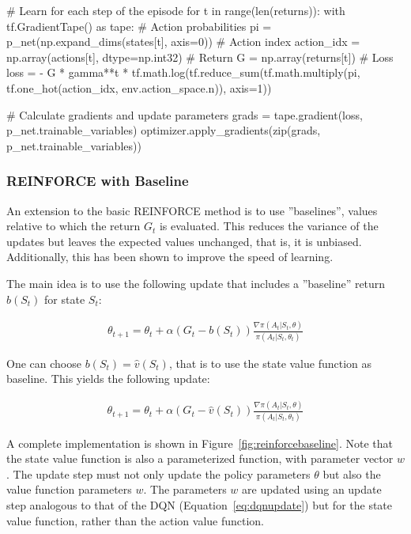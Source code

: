 \begin{pythoncode}
    # Learn for each step of the episode
    for t in range(len(returns)):
        with tf.GradientTape() as tape:
            # Action probabilities
            pi = p_net(np.expand_dims(states[t], axis=0))
            # Action index
            action_idx = np.array(actions[t], dtype=np.int32)
            # Return
            G = np.array(returns[t])
            # Loss
            loss = - G * gamma**t * 
                tf.math.log(tf.reduce_sum(tf.math.multiply(pi, 
                    tf.one_hot(action_idx, env.action_space.n)), axis=1))

        # Calculate gradients and update parameters
        grads = tape.gradient(loss, p_net.trainable_variables)
        optimizer.apply_gradients(zip(grads, p_net.trainable_variables))
\end{pythoncode}


\subsubsection*{REINFORCE with Baseline}

An extension to the basic REINFORCE method is to use ''baselines'', values relative to which the return $G_t$ is evaluated. This reduces the variance of the updates but leaves the expected values unchanged, that is, it is unbiased. Additionally, this has been shown to improve the speed of learning. 

The main idea is to use the following update that includes a ''baseline'' return $b(S_t)$ for state $S_t$:

\begin{align*}
\theta_{t+1} = \theta_t + \alpha(G_t - b(S_t)) \frac{\nabla \pi(A_t | S_t, \theta)}{\pi(A_t | S_t, \theta_t)}
\end{align*}

One can choose $b(S_t) = \hat{v}(S_t)$, that is to use the state value function as baseline. This yields the following update:

\begin{align*}
\theta_{t+1} = \theta_t + \alpha(G_t - \hat{v}(S_t)) \frac{\nabla \pi(A_t | S_t, \theta)}{\pi(A_t | S_t, \theta_t)}
\end{align*}

A complete implementation is shown in Figure~\ref{fig:reinforcebaseline}. Note that the state value function is also a parameterized function, with parameter vector $w$. The update step must not only update the policy parameters $\theta$ but also the value function parameters $w$. The parameters $w$ are updated using an update step analogous to that of the DQN (Equation~\ref{eq:dqnupdate}) but for the state value function, rather than the action value function.

